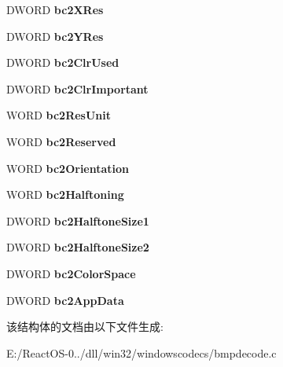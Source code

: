 \begin{DoxyCompactItemize}
D\+W\+O\+RD {\bfseries bc2\+X\+Res}
\item 
\mbox{\label{struct_b_i_t_m_a_p_c_o_r_e_h_e_a_d_e_r2_aa7dfa95e605a1cb98a62d7594ae65159}} 
D\+W\+O\+RD {\bfseries bc2\+Y\+Res}
\item 
\mbox{\label{struct_b_i_t_m_a_p_c_o_r_e_h_e_a_d_e_r2_afb32e61398d65307e31fa5766ccf4af5}} 
D\+W\+O\+RD {\bfseries bc2\+Clr\+Used}
\item 
\mbox{\label{struct_b_i_t_m_a_p_c_o_r_e_h_e_a_d_e_r2_a770d2b691cfd3a972468cff2a0554538}} 
D\+W\+O\+RD {\bfseries bc2\+Clr\+Important}
\item 
\mbox{\label{struct_b_i_t_m_a_p_c_o_r_e_h_e_a_d_e_r2_afcec6c0ce5d87b42ba653eff5ab35f97}} 
W\+O\+RD {\bfseries bc2\+Res\+Unit}
\item 
\mbox{\label{struct_b_i_t_m_a_p_c_o_r_e_h_e_a_d_e_r2_aad9e4c91512c36d6256d8365262cf5f3}} 
W\+O\+RD {\bfseries bc2\+Reserved}
\item 
\mbox{\label{struct_b_i_t_m_a_p_c_o_r_e_h_e_a_d_e_r2_a0d8192bfa1fa448e74ad6c5699ed8209}} 
W\+O\+RD {\bfseries bc2\+Orientation}
\item 
\mbox{\label{struct_b_i_t_m_a_p_c_o_r_e_h_e_a_d_e_r2_aaaef7b3dd931325602448e34b2bcedbf}} 
W\+O\+RD {\bfseries bc2\+Halftoning}
\item 
\mbox{\label{struct_b_i_t_m_a_p_c_o_r_e_h_e_a_d_e_r2_a5d423c3b71925623d13a8b8f858636f1}} 
D\+W\+O\+RD {\bfseries bc2\+Halftone\+Size1}
\item 
\mbox{\label{struct_b_i_t_m_a_p_c_o_r_e_h_e_a_d_e_r2_a95e616b3444d405bf863af279c18d9f3}} 
D\+W\+O\+RD {\bfseries bc2\+Halftone\+Size2}
\item 
\mbox{\label{struct_b_i_t_m_a_p_c_o_r_e_h_e_a_d_e_r2_acf4c4030358f7d7b7d2d9e1a01b54d6e}} 
D\+W\+O\+RD {\bfseries bc2\+Color\+Space}
\item 
\mbox{\label{struct_b_i_t_m_a_p_c_o_r_e_h_e_a_d_e_r2_a0e79b5300d365687f6c0cf9d67b254d8}} 
D\+W\+O\+RD {\bfseries bc2\+App\+Data}
\end{DoxyCompactItemize}


该结构体的文档由以下文件生成\+:\begin{DoxyCompactItemize}
\item 
E\+:/\+React\+O\+S-\/0../dll/win32/windowscodecs/bmpdecode.\+c\end{DoxyCompactItemize}
